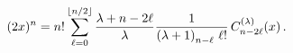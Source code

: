 \[(2x)^{n}=n!\sum_{\ell=0}^{\left\lfloor n/2\right\rfloor}\frac{\lambda+n-2\ell}%
{\lambda}\frac{1}{\left(\lambda+1\right)_{n-\ell}\,\ell!}\mathop{C^{(\lambda)}%
_{n-2\ell}\/}\nolimits\!\left(x\right).\]